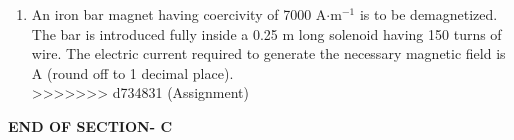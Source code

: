 \documentclass[journal,12pt,onecolumn]{IEEEtran}
\begin{document}
\begin{enumerate}
\vspace{0.5cm}

\item An iron bar magnet having coercivity of 7000 A$\cdot$m$^{-1}$ is to be demagnetized. The bar is introduced fully inside a 0.25 m long solenoid having 150 turns of wire. The electric current required to generate the necessary magnetic field is \underline{\hspace{2cm}} A (round off to 1 decimal place).
\hfill{} \\

\vspace{0.2cm}
>>>>>>> d734831 (Assignment)

\end{enumerate}

\begin{center}
    \item[\textbf{END OF SECTION- C}]
\end{center}


\newpage
\end{document}
